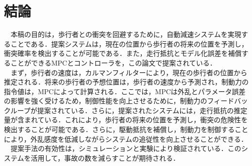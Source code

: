 \section{結論}
　本稿の目的は，歩行者との衝突を回避するために，自動減速システムを実現することである．提案システムは，現在の位置から歩行者の将来の位置を予測し，衝突確率を検出することが可能である．また，走行抵抗とモデル化誤差を補償することができるMPCとコントローラを，この論文で提案されている．\\
　まず，歩行者の速度は，カルマンフィルターにより，現在の歩行者の位置から推定される．将来の歩行者の予想位置は，歩行者の速度から予測され，制動力の指令値は，MPCによって計算される．ここでは，MPCは外乱とパラメータ誤差の影響を強く受けるため，制御性能を向上させるために，制動力のフィードバックループが提案されている．さらに，提案されたシステムには，走行抵抗の推定量が含まれている．これにより，歩行者の将来の位置を予測し，衝突の危険性を検出することが可能である．さらに，駆動抵抗を補償し，制動力を制御することにより，外乱感度を低減しながらシステムの追従性を向上させることができる．\\
　提案手法の有効性は，シミュレーションと実験により検証されている．このシステムを活用して，事故の数を減らすことが期待される．


